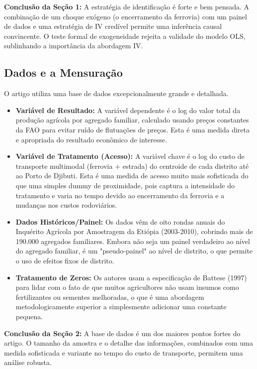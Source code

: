 \documentclass[12pt, a4paper]{article}
\begin{document}
\noindent\textbf{Conclusão da Seção 1:} A estratégia de identificação é forte e bem pensada. A combinação de um choque exógeno (o encerramento da ferrovia) com um painel de dados e uma estratégia de IV credível permite uma inferência causal convincente. O teste formal de exogeneidade rejeita a validade do modelo OLS, sublinhando a importância da abordagem IV.

\subsection{Dados e a Mensuração}
O artigo utiliza uma base de dados excepcionalmente grande e detalhada.
\begin{itemize}
    \item \textbf{Variável de Resultado:} A variável dependente é o log do valor total da produção agrícola por agregado familiar, calculado usando preços constantes da FAO para evitar ruído de flutuações de preços. Esta é uma medida direta e apropriada do resultado econômico de interesse.
    \item \textbf{Variável de Tratamento (Acesso):} A variável chave é o log do custo de transporte multimodal (ferrovia + estrada) do centroide de cada distrito até ao Porto de Djibuti. Esta é uma medida de acesso muito mais sofisticada do que uma simples dummy de proximidade, pois captura a intensidade do tratamento e varia no tempo devido ao encerramento da ferrovia e a mudanças nos custos rodoviários.
    \item \textbf{Dados Históricos/Painel:} Os dados vêm de oito rondas anuais do Inquérito Agrícola por Amostragem da Etiópia (2003-2010), cobrindo mais de 190.000 agregados familiares. Embora não seja um painel verdadeiro ao nível do agregado familiar, é um "pseudo-painel" ao nível de distrito, o que permite o uso de efeitos fixos de distrito.
    \item \textbf{Tratamento de Zeros:} Os autores usam a especificação de Battese (1997) para lidar com o fato de que muitos agricultores não usam insumos como fertilizantes ou sementes melhoradas, o que é uma abordagem metodologicamente superior a simplesmente adicionar uma constante pequena.
\end{itemize}

\noindent\textbf{Conclusão da Seção 2:} A base de dados é um dos maiores pontos fortes do artigo. O tamanho da amostra e o detalhe das informações, combinados com uma medida sofisticada e variante no tempo do custo de transporte, permitem uma análise robusta.
\end{document}
